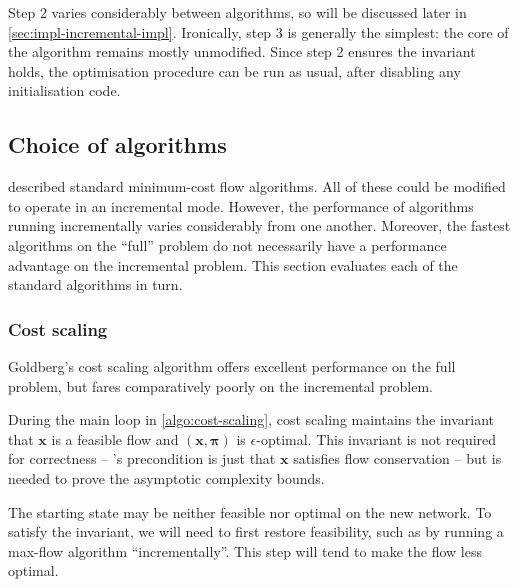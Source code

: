Step 2 varies considerably between algorithms, so will be discussed later in \cref{sec:impl-incremental-impl}. Ironically, step 3 is generally the simplest: the core of the algorithm remains mostly unmodified. Since step 2 ensures the invariant holds, the optimisation procedure can be run as usual, after disabling any initialisation code.


\subsection{Choice of algorithms} \label{sec:impl-incremental-choice}
 described standard minimum-cost flow algorithms. All of these could be modified to operate in an incremental mode. However, the performance of algorithms running incrementally varies considerably from one another. Moreover, the fastest algorithms on the ``full'' problem do not necessarily have a performance advantage on the incremental problem. This section evaluates each of the standard algorithms in turn.

\subsubsection{Cost scaling} 
Goldberg's cost scaling algorithm offers excellent performance on the full problem, but fares comparatively poorly on the incremental problem. 

During the main loop in \cref{algo:cost-scaling}, cost scaling maintains the invariant that $\mathbf{x}$ is a feasible flow and $\left(\mathbf{x},\boldsymbol{\pi}\right)$ is $\epsilon$-optimal. This invariant is not required for correctness -- 's precondition is just that $\mathbf{x}$ satisfies flow conservation -- but is needed to prove the asymptotic complexity bounds.

The starting state may be neither feasible nor optimal on the new network. To satisfy the invariant, we will need to first restore feasibility, such as by running a max-flow algorithm ``incrementally''\footnotemark. This step will tend to make the flow less optimal.

